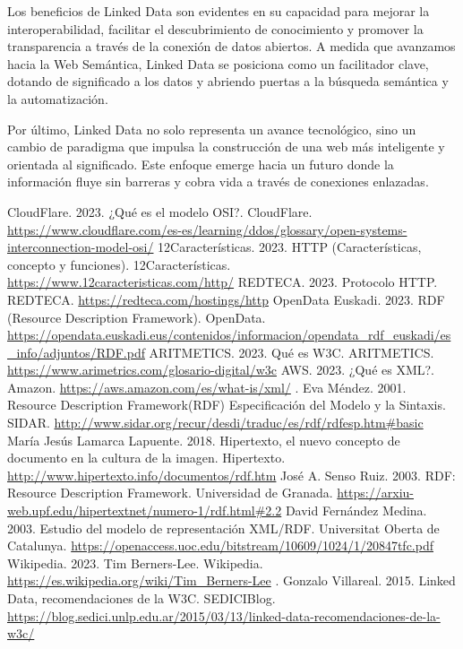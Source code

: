 \documentclass[11pt]{report}
\begin{document}
Los beneficios de Linked Data son evidentes en su capacidad para mejorar la interoperabilidad, facilitar el descubrimiento de conocimiento y promover la transparencia a través de la conexión de datos abiertos. A medida que avanzamos hacia la Web Semántica, Linked Data se posiciona como un facilitador clave, dotando de significado a los datos y abriendo puertas a la búsqueda semántica y la automatización.

Por último, Linked Data no solo representa un avance tecnológico, sino un cambio de paradigma que impulsa la construcción de una web más inteligente y orientada al significado. Este enfoque emerge hacia un futuro donde la información fluye sin barreras y cobra vida a través de conexiones enlazadas.

\begin{thebibliography}{99}
	 CloudFlare. 2023.  ¿Qué es el modelo OSI?.  CloudFlare.  \url{https://www.cloudflare.com/es-es/learning/ddos/glossary/open-systems-interconnection-model-osi/}
	 12Características. 2023. HTTP (Características, concepto y funciones). 12Características. \url{https://www.12caracteristicas.com/http/}
	 REDTECA. 2023. Protocolo HTTP. REDTECA. \url{https://redteca.com/hostings/http}
	OpenData Euskadi. 2023. RDF (Resource Description Framework). OpenData. \url{https://opendata.euskadi.eus/contenidos/informacion/opendata_rdf_euskadi/es_info/adjuntos/RDF.pdf}
	 ARITMETICS. 2023. Qué es W3C. ARITMETICS. \url{https://www.arimetrics.com/glosario-digital/w3c}
	 AWS. 2023. ¿Qué es XML?. Amazon. \url{https://aws.amazon.com/es/what-is/xml/}
	.  Eva Méndez. 2001. Resource Description Framework(RDF)	Especificación del Modelo y la Sintaxis. SIDAR. \url{http://www.sidar.org/recur/desdi/traduc/es/rdf/rdfesp.htm#basic}
	 María Jesús Lamarca Lapuente. 2018. Hipertexto, el nuevo concepto de documento en la cultura de la imagen. Hipertexto. \url{http://www.hipertexto.info/documentos/rdf.htm}
	 José A. Senso Ruiz. 2003. RDF: Resource Description Framework. Universidad de Granada. \url{https://arxiu-web.upf.edu/hipertextnet/numero-1/rdf.html#2.2}
	 David Fernández Medina. 2003. Estudio del modelo de representación XML/RDF. Universitat Oberta de Catalunya. \url{https://openaccess.uoc.edu/bitstream/10609/1024/1/20847tfc.pdf}
	 Wikipedia. 2023. Tim Berners-Lee. Wikipedia. \url{https://es.wikipedia.org/wiki/Tim_Berners-Lee}
	. Gonzalo Villareal. 2015. Linked Data, recomendaciones de la W3C. SEDICIBlog. \url{https://blog.sedici.unlp.edu.ar/2015/03/13/linked-data-recomendaciones-de-la-w3c/}

\end{thebibliography}
\end{document}
